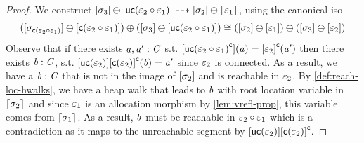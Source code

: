\begin{proof}
    We construct $[\sigma_3] \ominus [\mathsf{uc}(\varepsilon_2 \circ \varepsilon_1)] \dashrightarrow [\sigma_2] \ominus \lfloor\varepsilon_1\rfloor$, 
    using the canonical iso
    \[ ([\sigma_{\mathsf{c}(\varepsilon_2 \circ \varepsilon_1)}] \ominus [\mathsf{c}(\varepsilon_2 \circ \varepsilon_1)]) \oplus 
       ([\sigma_3] \ominus [\mathsf{uc}(\varepsilon_2 \circ \varepsilon_1)]) \cong ([\sigma_2] \ominus [\varepsilon_1]) \oplus ([\sigma_3] \ominus [\varepsilon_2]) \]
    Observe that if there exists $\mathit{a}, \mathit{a}' : \mathit{C}$ s.t. $[{\mathsf{uc}(\varepsilon_2 \circ \varepsilon_1)}^\mathsf{c}](\mathit{a}) = {[\varepsilon_2]}^\mathsf{c}(\mathit{a}')$
    then there exists $\mathit{b} : \mathit{C}$, s.t. $[\mathsf{uc}(\varepsilon_2)]{[\mathsf{c}(\varepsilon_2)]}^\mathsf{c}(\mathit{b}) = \mathit{a}'$ since $\varepsilon_2$ is connected. 
    As a result, we have a $\mathit{b} : \mathit{C}$ that is not in the image of $[\sigma_2]$ and is reachable in $\varepsilon_2$.
    By \cref{def:reach-loc-hwalks}, we have a heap walk that leads to $\mathit{b}$ with root location variable in $\lceil\sigma_2\rceil$ and since $\varepsilon_1$ is an allocation morphism
    by \cref{lem:vrefl-prop}, this variable comes from $\lceil\sigma_1\rceil$. 
    As a result, $\mathit{b}$ must be reachable in $\varepsilon_2 \circ \varepsilon_1$ which is a contradiction as it maps to the unreachable segment by $[\mathsf{uc}(\varepsilon_2)]{[\mathsf{c}(\varepsilon_2)]}^\mathsf{c}$.
\end{proof}

